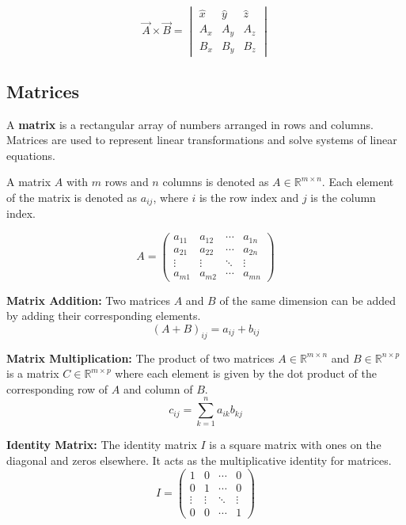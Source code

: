 \documentclass[11pt]{article}
\begin{document}
\[
    \vec{A} \times \vec{B} = \begin{vmatrix}
        \hat{x} & \hat{y} & \hat{z} \\
        A_x     & A_y     & A_z     \\
        B_x     & B_y     & B_z
    \end{vmatrix}
\]

\subsection{Matrices}
A \textbf{matrix} is a rectangular array of numbers arranged in rows and columns. Matrices are used to represent linear transformations and solve systems of linear equations.

\begin{definition}
    A matrix \(A\) with \(m\) rows and \(n\) columns is denoted as \(A \in \mathbb{R}^{m \times n}\). Each element of the matrix is denoted as \(a_{ij}\), where \(i\) is the row index and \(j\) is the column index.
\end{definition}

\begin{equation}
    A = \begin{pmatrix}
        a_{11} & a_{12} & \cdots & a_{1n} \\
        a_{21} & a_{22} & \cdots & a_{2n} \\
        \vdots & \vdots & \ddots & \vdots \\
        a_{m1} & a_{m2} & \cdots & a_{mn}
    \end{pmatrix}
\end{equation}

\textbf{Matrix Addition:} Two matrices \(A\) and \(B\) of the same dimension can be added by adding their corresponding elements.
\begin{equation}
    (A + B)_{ij} = a_{ij} + b_{ij}
\end{equation}

\textbf{Matrix Multiplication:} The product of two matrices \(A \in \mathbb{R}^{m \times n}\) and \(B \in \mathbb{R}^{n \times p}\) is a matrix \(C \in \mathbb{R}^{m \times p}\) where each element is given by the dot product of the corresponding row of \(A\) and column of \(B\).
\begin{equation}
    c_{ij} = \sum_{k=1}^{n} a_{ik} b_{kj}
\end{equation}

\textbf{Identity Matrix:} The identity matrix \(I\) is a square matrix with ones on the diagonal and zeros elsewhere. It acts as the multiplicative identity for matrices.
\begin{equation}
    I = \begin{pmatrix}
        1 & 0 & \cdots & 0 \\
        0 & 1 & \cdots & 0 \\
        \vdots & \vdots & \ddots & \vdots \\
        0 & 0 & \cdots & 1
    \end{pmatrix}
\end{equation}
\end{document}
